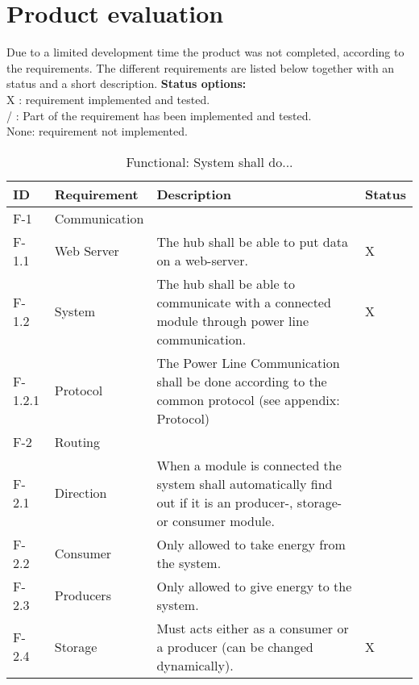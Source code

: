 \section{Product evaluation}
Due to a limited development time the product was not completed, according to the requirements. The different requirements are listed below together with an status and a short description.
\p \textbf{Status options:}
\\ X : requirement implemented and tested.
\\ / : Part of the requirement has been implemented and tested.
\\ None: requirement not implemented.
\begin{table}[H]
	\begin{tabular} [b] {| p{1.1cm} |  p{2.5cm} | p{11.0cm} | p{1.0cm} |}
	\hline
	\textbf{ID} & \textbf{Requirement} & \textbf{Description} & Status\\\hline
		F-1 & Communication 	&  ~ & ~ \\ \hline
		F-1.1 & Web Server 		& The hub shall be able to put data on a web-server. & X \\ \hline
		F-1.2 & System 		& The hub shall be able to communicate with a connected module through power line communication. & X \\ \hline
		F-1.2.1 & Protocol 		& The Power Line Communication shall be done according to the common protocol (see appendix: Protocol) & ~ \\ \hline
		F-2 & Routing 			&~&~\\ \hline
		F-2.1 & Direction		& When a module is connected the system shall automatically find out if it is an producer-, storage- or consumer module. & ~ \\ \hline
		F-2.2 & Consumer		& Only allowed to take energy from the system. & ~ \\ \hline
		F-2.3 & Producers 		& Only allowed to give energy to the system. & ~ \\ \hline
		F-2.4 & Storage 		& Must acts either as a consumer or a producer (can be changed dynamically). & X \\ \hline
	\end{tabular}
	\caption{Functional: System shall do...}
\end{table}
